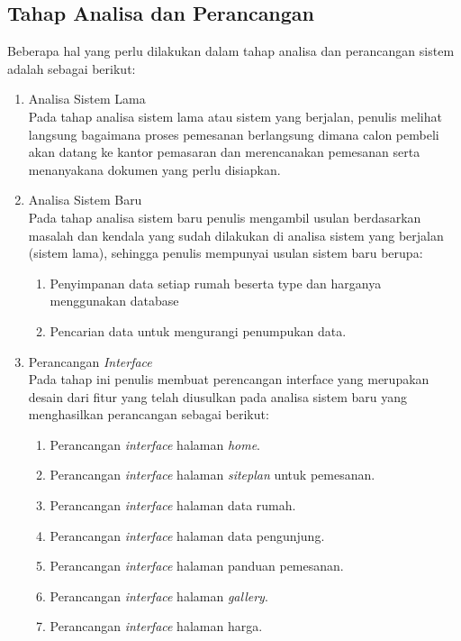 \subsection{Tahap Analisa dan Perancangan}
\par Beberapa hal yang perlu dilakukan dalam tahap analisa dan perancangan sistem adalah sebagai berikut:

\begin{enumerate}
	    \item Analisa Sistem Lama\\Pada tahap analisa sistem lama atau sistem yang berjalan, penulis melihat langsung bagaimana proses pemesanan berlangsung dimana calon pembeli akan datang ke kantor pemasaran dan merencanakan pemesanan serta menanyakana dokumen yang perlu disiapkan. 
	    \item Analisa Sistem Baru\\Pada tahap analisa sistem baru penulis mengambil usulan berdasarkan masalah dan kendala yang sudah dilakukan di analisa sistem yang berjalan (sistem lama), sehingga penulis mempunyai usulan sistem baru berupa:
			\begin{enumerate} 
			\item Penyimpanan data setiap rumah beserta type dan harganya menggunakan database
			\item Pencarian data untuk mengurangi penumpukan data.
			\end{enumerate}
	    \item Perancangan \textit{Interface}\\Pada tahap ini penulis membuat perencangan interface yang merupakan desain dari fitur yang telah diusulkan pada analisa sistem baru yang menghasilkan perancangan sebagai berikut:
	\begin{enumerate} [label=\alph*.]
		\item Perancangan \textit{interface} halaman \textit{home}.
		\item Perancangan \textit{interface} halaman \textit{siteplan} untuk pemesanan.
		\item Perancangan \textit{interface} halaman data rumah.
		\item Perancangan \textit{interface} halaman data pengunjung.
		\item Perancangan \textit{interface} halaman panduan pemesanan.
		\item Perancangan \textit{interface} halaman \textit{gallery}.
		\item Perancangan \textit{interface} halaman harga.

\end{enumerate}
\end{enumerate}
